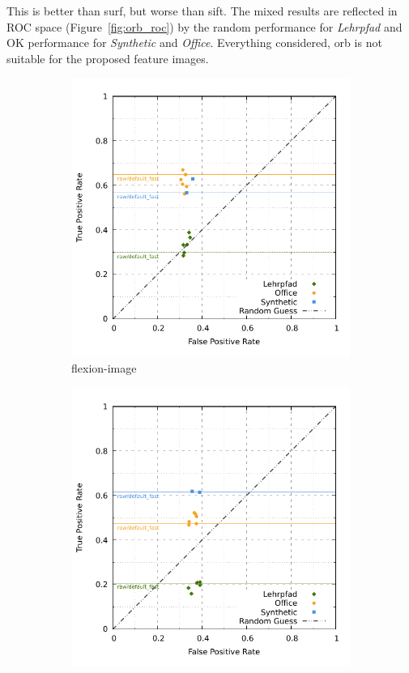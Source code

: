 This is better than \acrshort{surf}, but worse than \acrshort{sift}.
The mixed results are reflected in ROC space (Figure~\ref{fig:orb_roc}) by the random performance for \emph{Lehrpfad} and OK performance for \emph{Synthetic} and \emph{Office}.
Everything considered, \acrshort{orb} is not suitable for the proposed feature images.
\begin{figure}[htp]
\begin{subfigure}[t]{0.45\linewidth}
    \includegraphics[width=\linewidth]{chapter06/results/ORB/flexion/roc.pdf}%
    \caption{\gls{flexion-image}}
\end{subfigure}\quad
\begin{subfigure}[t]{0.45\linewidth}
    \includegraphics[width=\linewidth]{chapter06/results/ORB/bearing/roc.pdf}

\end{subfigure}
\end{figure}
